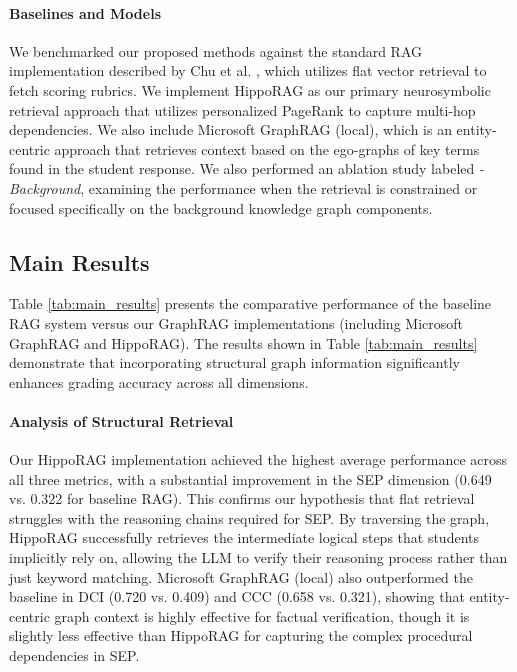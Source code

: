 \documentclass{edm_article}
\begin{document}
\paragraph{Baselines and Models}
We benchmarked our proposed methods against the standard RAG implementation described by Chu et al. \cite{chu2025enhancing}, which utilizes flat vector retrieval to fetch scoring rubrics. We implement HippoRAG as our primary neurosymbolic retrieval approach that utilizes personalized PageRank to capture multi-hop dependencies. We also include Microsoft GraphRAG (local), which is an entity-centric approach that retrieves context based on the ego-graphs of key terms found in the student response.
We also performed an ablation study labeled \textit{-Background}, examining the performance when the retrieval is constrained or focused specifically on the background knowledge graph components.

\subsection{Main Results}

Table \ref{tab:main_results} presents the comparative performance of the baseline RAG system versus our GraphRAG implementations (including Microsoft GraphRAG and HippoRAG). The results shown in Table \ref{tab:main_results} demonstrate that incorporating structural graph information significantly enhances grading accuracy across all dimensions.



\paragraph{Analysis of Structural Retrieval}

Our HippoRAG implementation achieved the highest average performance across all three metrics, with a substantial improvement in the SEP dimension (0.649 vs. 0.322 for baseline RAG). This confirms our hypothesis that flat retrieval struggles with the reasoning chains required for SEP. By traversing the graph, HippoRAG successfully retrieves the intermediate logical steps that students implicitly rely on, allowing the LLM to verify their reasoning process rather than just keyword matching. Microsoft GraphRAG (local) also outperformed the baseline in DCI (0.720 vs. 0.409) and CCC (0.658 vs. 0.321), showing that entity-centric graph context is highly effective for factual verification, though it is slightly less effective than HippoRAG for capturing the complex procedural dependencies in SEP.
\end{document}
